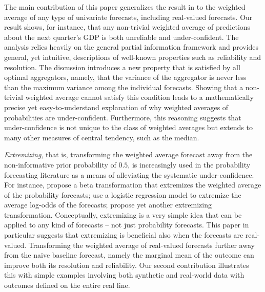 \documentclass[11pt]{article}
\theoremstyle{definition}
\theoremstyle{definition}
\begin{document}
The main contribution of this paper generalizes the result
in \cite{Ranjan08} to the weighted average of any type of univariate
forecasts, including real-valued forecasts.
Our result shows, for instance, that any non-trivial
weighted average of predictions about the next quarter's GDP
is both unreliable and under-confident. The analysis relies heavily on the general partial
information framework and
provides general, yet intuitive, descriptions of well-known properties
such as reliability and resolution. The discussion introduces a new property
that is satisfied by all optimal aggregators, namely, that the variance of
the aggregator is
never less than the maximum variance among the individual
forecasts. Showing that a non-trivial weighted average cannot satisfy
this condition leads to a mathematically precise yet
easy-to-understand explanation of why weighted averages of probabilities are
under-confident.  Furthermore, this reasoning suggests that
under-confidence is not unique to the class of weighted averages but
extends to many other measures of central tendency, such as the
median.

\textit{Extremizing}, that is, transforming the weighted average forecast away from the non-informative  prior probability of $0.5$,
is increasingly used in the probability forecasting literature as a means of
alleviating the systematic under-confidence. For instance, \cite{Ranjan08} propose a beta transformation that extremizes the weighted average of
  the probability forecasts; \cite{satopaa} use a logistic regression model to extremize the average log-odds of the
  forecasts; \cite{baron2014two} propose yet another extremizing  transformation.
Conceptually, extremizing is a very simple idea that can be applied to any kind of forecasts -- not just probability forecasts. This paper in particular suggests that extremizing is beneficial also when the forecasts are real-valued. 
Transforming the weighted average of real-valued forecasts further away from the  naive baseline forecast, namely the marginal mean of the outcome
can improve both its
resolution and reliability.
Our second contribution illustrates
this with simple examples involving both synthetic and real-world data
with outcomes defined on the entire real line.
\end{document}
